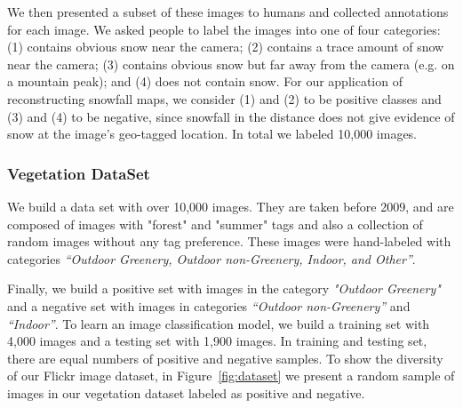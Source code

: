 We then presented a subset of these images to humans and collected
annotations for each image. We asked people to label
the images into one of four categories: (1) contains obvious
snow near the camera; (2) contains a trace amount of snow near
the camera; (3) contains obvious snow but far away from the
camera (e.g. on a mountain peak); and (4) does not contain snow. 
For our application of reconstructing snowfall maps, we consider (1)
and (2) to be positive classes and (3) and (4) to be negative,
since snowfall in the distance does not give evidence of snow
at the image's geo-tagged location. In total we labeled 10,000 images.

\subsubsection{Vegetation DataSet}


We build a data set with over 10,000 images. They are taken before 2009, and are composed of images with "forest" and "summer" tags and also a collection of random images without any tag preference. These images were hand-labeled with categories 
\textit{``Outdoor Greenery, Outdoor non-Greenery, Indoor, and Other''}.

Finally, we build a positive set with images in the category \textit{"Outdoor Greenery"} and a negative set 
with images in categories \textit{``Outdoor non-Greenery''} and \textit{``Indoor''}. To learn an image classification model, we build a training set with 4,000 images and a testing set with 1,900 images. In training and testing set, there are equal numbers of positive and negative samples.
To show the diversity of our Flickr image dataset, in Figure~\ref{fig:dataset} we present a random sample of images in our vegetation dataset labeled as positive and negative.


%
%







